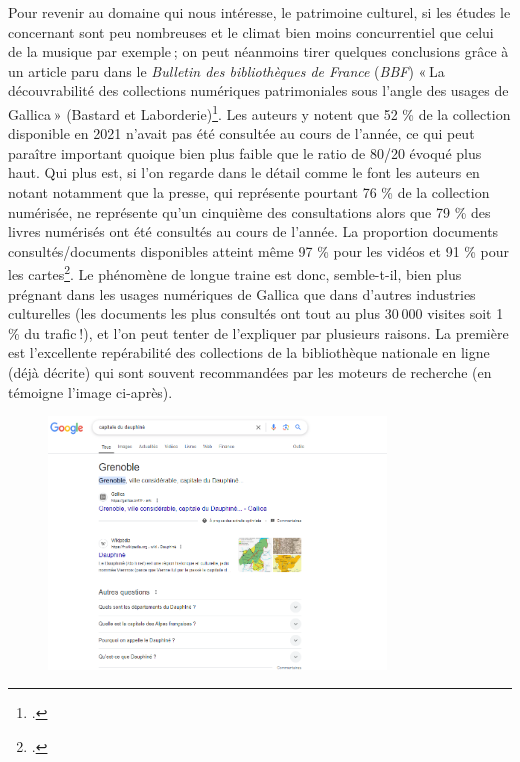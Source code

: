 Pour revenir au domaine qui nous intéresse, le patrimoine culturel, si les études le concernant sont peu nombreuses et le climat bien moins concurrentiel que celui de la musique par exemple ; on peut néanmoins tirer quelques conclusions grâce à un article paru dans le \textit{Bulletin des bibliothèques de France} (\textit{BBF}) « La découvrabilité des collections numériques patrimoniales sous l’angle des usages de Gallica » (Bastard et Laborderie)\footcite{bastard2023}. Les auteurs y notent que 52 \% de la collection disponible en 2021 n’avait pas été consultée au cours de l’année, ce qui peut paraître important quoique bien plus faible que le ratio de 80/20 évoqué plus haut. Qui plus est, si l’on regarde dans le détail comme le font les auteurs en notant notamment que la presse, qui représente pourtant 76 \% de la collection numérisée, ne représente qu’un cinquième des consultations alors que 79 \% des livres numérisés ont été consultés au cours de l’année. La proportion documents consultés/documents disponibles atteint même 97 \% pour les vidéos et 91 \% pour les cartes\footcite[§ 8]{bastard2023}. Le phénomène de longue traine est donc, semble-t-il, bien plus prégnant dans les usages numériques de Gallica que dans d’autres industries culturelles (les documents les plus consultés ont tout au plus 30 000 visites soit 1 \% du trafic !), et l’on peut tenter de l’expliquer par plusieurs raisons. La première est l’excellente repérabilité des collections de la bibliothèque nationale en ligne (déjà décrite) qui sont souvent recommandées par les moteurs de recherche (en témoigne l’image ci-après).


\begin{figure}[h!]
	\centering
	\includegraphics[width=0.8\textwidth]{images/image25.png}
	\label{fig:image25}
\end{figure}




